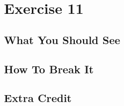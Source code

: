 \chapter{Exercise 11}


\section{What You Should See}


\section{How To Break It}


\section{Extra Credit}



